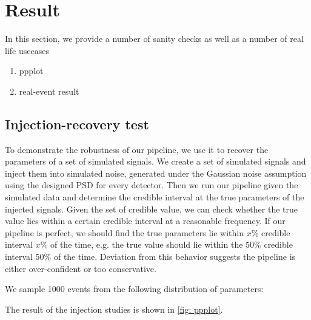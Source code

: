 \documentclass[twocolumn]{aastex631}
\begin{document}
\section{Result}
\label{sec: Result}

In this section, we provide a number of sanity checks as well as a number of real life usecases

\begin{enumerate}
    \item ppplot
    \item real-event result
\end{enumerate}

\subsection{Injection-recovery test}

To demonstrate the robustness of our pipeline, we use it to recover the
parameters of a set of simulated signals. We create a set of simulated signals
and inject them into simulated noise, generated under the Gaussian noise
assumption using the designed PSD for every detector. Then we run our pipeline
given the simulated data and determine the credible interval at the true
parameters of the injected signals. Given the set of credible value, we can
check whether the true value lies within a certain credible interval at a
reasonable frequency. If our pipeline is perfect, we should find the true
parameters lie within $x\%$ credible interval $x\%$ of the time, e.g. the true
value should lie within the $50\%$ credible interval $50\%$ of the time.
Deviation from this behavior suggests the pipeline is either over-confident or
too conservative.

We sample 1000 events from the following distribution of parameters:


The result of the injection studies is shown in \ref{fig: ppplot}.
\end{document}
